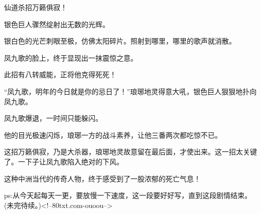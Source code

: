 \begin{this_body}
仙道杀招万籁俱寂！

银色巨人骤然绽射出无数的光辉。

银白色的光芒刺眼至极，仿佛太阳碎片。照射到哪里，哪里的歌声就消散。

凤九歌的脸上，终于显现出一抹震惊之意。

此招有八转威能，正将他克得死死！

“凤九歌，明年的今日就是你的忌日了！”琅琊地灵得意大吼，银色巨人狠狠地扑向凤九歌。

凤九歌爆退，一时间只能躲闪。

他的目光极速闪烁，琅琊一方的战斗素养，让他三番两次都吃惊不已。

这招万籁俱寂，乃是大杀器，琅琊地灵故意留在最后面，才使出来。这一招太关键了。一下子让凤九歌陷入绝对的下风。

这种中洲当代的传奇人物，终于感受到了一股浓郁的死亡气息！

ps:从今天起每天一更，要放慢一下速度，这一段要好好写，直到这段剧情结束。(未完待续。)<!--80txt.com-ouoou-->

\end{this_body}

